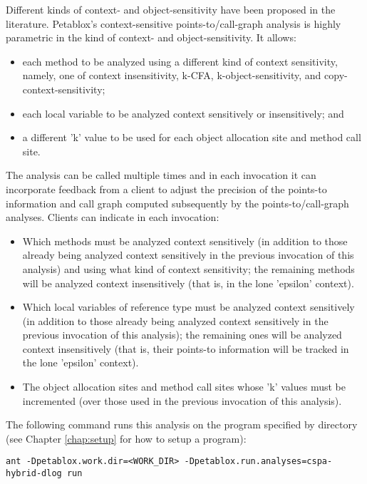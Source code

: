 Different kinds of context- and object-sensitivity have been proposed in the
literature.  Petablox's context-sensitive points-to/call-graph analysis is highly
parametric in the kind of context- and object-sensitivity.  It allows:
\begin{itemize}
\item
each method to be analyzed using a different kind of context sensitivity,
namely, one of context insensitivity, k-CFA, k-object-sensitivity, and
copy-context-sensitivity;
\item
each local variable to be analyzed context sensitively or insensitively; and
\item
a different 'k' value to be used for each object allocation site and method
call site.
\end{itemize}

The analysis can be called multiple times and in each invocation it can
incorporate feedback from a client to adjust the precision of the points-to
information and call graph computed subsequently by the points-to/call-graph
analyses.  Clients can indicate in each invocation:

\begin{itemize}
\item
Which methods must be analyzed context sensitively (in addition to those already being
analyzed context sensitively in the previous invocation of this analysis) and using
what kind of context sensitivity; the remaining methods will be analyzed context
insensitively (that is, in the lone 'epsilon' context).
\item
Which local variables of reference type must be analyzed context sensitively (in
addition to those already being analyzed context sensitively in the previous
invocation of this analysis); the remaining ones will be analyzed context insensitively
(that is, their points-to information will be tracked in the lone 'epsilon' context).
\item
The object allocation sites and method call sites whose 'k' values must be incremented
(over those used in the previous invocation of this analysis).
\end{itemize}

The following command runs this analysis on the program specified
by directory  (see Chapter \ref{chap:setup} for how to setup a
program):

\begin{framed}
\begin{verbatim}
ant -Dpetablox.work.dir=<WORK_DIR> -Dpetablox.run.analyses=cspa-hybrid-dlog run
\end{verbatim}
\end{framed}

